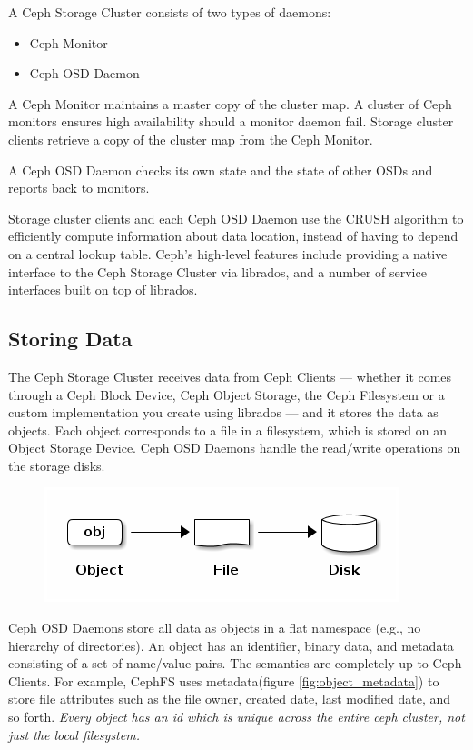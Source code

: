 \documentclass[12pt,a4paper]{report}
\begin{document}
A Ceph Storage Cluster consists of two types of daemons:

\begin{itemize}
	\item Ceph Monitor
	\item Ceph OSD Daemon
\end{itemize}

A Ceph Monitor maintains a master copy of the cluster map. A cluster of Ceph
monitors ensures high availability should a monitor daemon fail. Storage
cluster clients retrieve a copy of the cluster map from the Ceph Monitor.

A Ceph OSD Daemon checks its own state and the state of other OSDs and reports
back to monitors.

Storage cluster clients and each Ceph OSD Daemon use the CRUSH algorithm to
efficiently compute information about data location, instead of having to
depend on a central lookup table. Ceph’s high-level features include providing
a native interface to the Ceph Storage Cluster via librados, and a number of
service interfaces built on top of librados.

\subsection{Storing Data}

The Ceph Storage Cluster receives data from Ceph Clients --- whether it comes
through a Ceph Block Device, Ceph Object Storage, the Ceph Filesystem or a
custom implementation you create using librados --- and it stores the data as
objects. Each object corresponds to a file in a filesystem, which is stored on
an Object Storage Device. Ceph OSD Daemons handle the read/write operations on
the storage disks.

\begin{figure}[h]
	\includegraphics[scale=0.75]{object_file_disk.png}
	\label{fig:object_file_disk}
\end{figure}

Ceph OSD Daemons store all data as objects in a flat namespace (e.g., no
hierarchy of directories). An object has an identifier, binary data, and
metadata consisting of a set of name/value pairs. The semantics are completely
up to Ceph Clients. For example, CephFS uses metadata(figure
\ref{fig:object_metadata}) to store file attributes such as the file owner,
created date, last modified date, and so forth. \emph{Every object has an id which is
unique across the entire ceph cluster, not just the local filesystem.}
\end{document}
